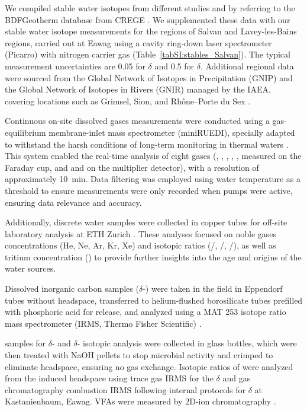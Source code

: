 We compiled stable water isotopes from different studies \citep{vuataz1982hydrogeologie,sonney2009numerical,sonney2010groundwater} and by referring to the BDFGeotherm database from CREGE \citep{sonney2010database}.
We supplemented these data with our stable water isotope measurements for the regions of Salvan and Lavey-les-Bains regions, carried out at Eawag using a cavity ring-down laser spectrometer (Picarro) with nitrogen carrier gas (Table~\ref{tabSI:stables_Salvan}). 
The typical measurement uncertainties are \SI{0.05}{\permille} for $\delta$ and \SI{0.5}{\permille} for $\delta$.
Additional regional data were sourced from the Global Network of Isotopes in Precipitation (GNIP) and the Global Network of Isotopes in Rivers (GNIR) managed by the IAEA, covering locations such as Grimsel, Sion, and Rhône--Porte du Sex \citep{iaea2024GNIP, iaea2024GNIR, naqua2024isot}.

Continuous on-site dissolved gases measurements were conducted using a gas-equilibrium membrane-inlet mass spectrometer (miniRUEDI), specially adapted to withstand the harsh conditions of long-term monitoring in thermal waters \citep{giroud2023new, brennwald2016portable}.
This system enabled the real-time analysis of eight gases (, , , , ,  measured on the Faraday cup, and  and  on the multiplier detector), with a resolution of approximately \SI{10}{\minute}.
Data filtering was employed using water temperature as a threshold to ensure measurements were only recorded when pumps were active, ensuring data relevance and accuracy.

Additionally, discrete water samples were collected in copper tubes for off-site laboratory analysis at ETH Zurich \citep{beyerle2000mass}.
These analyses focused on noble gases concentrations (He, Ne, Ar, Kr, Xe) and isotopic ratios (/, /, /), as well as tritium concentration () to provide further insights into the age and origins of the water sources.

Dissolved inorganic carbon samples ($\delta$-) were taken in the field in Eppendorf tubes without headspace, transferred to helium-flushed borosilicate tubes prefilled with phosphoric acid for  release, and analyzed using a MAT 253 isotope ratio mass spectrometer (IRMS, Thermo Fisher Scientific) \citep{vandijk2018oxygen}.

 samples for $\delta$- and $\delta$- isotopic analysis were collected in glass bottles, which were then treated with NaOH pellets to stop microbial activity and crimped to eliminate headspace, ensuring no gas exchange. 
Isotopic ratios of  were analyzed from the induced headspace using trace gas IRMS for the $\delta$ \citep{thomas2019lateral} and gas chromatography combustion IRMS following internal protocols for $\delta$ at Kastanienbaum, Eawag. 
VFAs were measured by 2D-ion chromatography \citep{glombitza2014vfas}.

